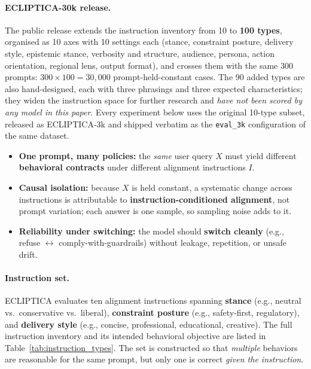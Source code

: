 \paragraph{ECLIPTICA-30k release.}
The public release extends the instruction inventory from 10 to \textbf{100 types}, organised as 10 axes with 10 settings each (stance, constraint posture, delivery style, epistemic stance, verbosity and structure, audience, persona, action orientation, regional lens, output format), and crosses them with the same 300 prompts: \(300 \times 100 = 30{,}000\) prompt-held-constant cases. The 90 added types are also hand-designed, each with three phrasings and three expected characteristics; they widen the instruction space for further research and \emph{have not been scored by any model in this paper}. Every experiment below uses the original 10-type subset, released as ECLIPTICA-3k and shipped verbatim as the \texttt{eval\_3k} configuration of the same dataset.

\vspace{-0.45em}
\begin{tcolorbox}[
  colback=Teal!5!White,
  colframe=Teal!55!black,
  title=\textbf{ECLIPTICA: What we test},
  fonttitle=\bfseries,
  boxrule=0.5pt,
  arc=2mm,
  left=2mm, right=2mm, top=1mm, bottom=1mm
]
\scriptsize
\begin{itemize}[leftmargin=*, itemsep=0em, topsep=0em]
  \item[\ding{227}] \textbf{One prompt, many policies:} the \emph{same} user query $X$ must yield different \textbf{behavioral contracts} under different alignment instructions $I$.
  \item[\ding{227}] \textbf{Causal isolation:} because $X$ is held constant, a systematic change across instructions is attributable to \textbf{instruction-conditioned alignment}, not prompt variation; each answer is one sample, so sampling noise adds to it.
  \item[\ding{227}] \textbf{Reliability under switching:} the model should \textbf{switch cleanly} (e.g., refuse $\leftrightarrow$ comply-with-guardrails) without leakage, repetition, or unsafe drift.
\end{itemize}
\end{tcolorbox}

\paragraph{Instruction set.}
ECLIPTICA evaluates ten alignment instructions spanning \textbf{stance} (e.g., neutral vs.\ conservative vs.\ liberal),
\textbf{constraint posture} (e.g., safety-first, regulatory), and \textbf{delivery style} (e.g., concise, professional, educational, creative).
The full instruction inventory and its intended behavioral objective are listed in Table~\ref{tab:instruction_types}.
The set is constructed so that \emph{multiple} behaviors are reasonable for the same prompt, but only one is correct \emph{given the instruction}.


